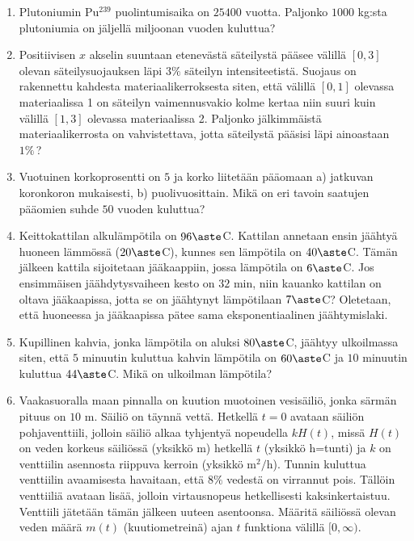 \Harj
\begin{enumerate}

\item
Plutoniumin Pu$^{239}$ puolintumisaika on $25400$ vuotta. Paljonko $1000$ kg:sta plutoniumia
on jäljellä miljoonan vuoden kuluttua?

\item
Positiivisen $x$ akselin suuntaan etenevästä säteilystä pääsee välillä $[0,3]$ olevan
säteilysuojauksen läpi $3\%$ säteilyn intensiteetistä. Suojaus on rakennettu kahdesta
materiaalikerroksesta siten, että välillä $[0,1]$ olevassa materiaalissa 1 on säteilyn 
vaimennusvakio kolme kertaa niin suuri kuin välillä $[1,3]$ olevassa materiaalissa 2. Paljonko
jälkimmäistä materiaalikerrosta on vahvistettava, jotta säteilystä pääsisi läpi ainoastaan
$1\%$\,?
 
\item
Vuotuinen korkoprosentti on $5$ ja korko liitetään pääomaan a) jatkuvan koronkoron mukaisesti,
b) puolivuosittain. Mikä on eri tavoin saatujen pääomien suhde $50$ vuoden kuluttua?

\item
Keittokattilan alkulämpötila on $96\aste$C. Kattilan annetaan ensin jäähtyä huoneen lämmössä
($20\aste$C), kunnes sen lämpötila on $40\aste$C. Tämän jälkeen kattila sijoitetaan 
jääkaappiin, jossa lämpötila on $6\aste$C. Jos ensimmäisen jäähdytysvaiheen kesto on $32$ min,
niin kauanko kattilan on oltava jääkaapissa, jotta se on jäähtynyt lämpötilaan $7\aste$C? 
Oletetaan, että huoneessa ja jääkaapissa pätee sama eksponentiaalinen jäähtymislaki.

\item
Kupillinen kahvia, jonka lämpötila on aluksi $80\aste$C, jäähtyy ulkoilmassa siten, että $5$ 
minuutin kuluttua kahvin lämpötila on $60\aste$C ja $10$ minuutin kuluttua $44\aste$C. Mikä on
ulkoilman lämpötila?
 
\item
Vaakasuoralla maan pinnalla on kuution muotoinen vesisäiliö, jonka särmän pituus on $10$ m.
Säiliö on täynnä vettä. Hetkellä $t=0$ avataan säiliön pohjaventtiili, jolloin säiliö alkaa
tyhjentyä nopeudella $kH(t)$, missä $H(t)$ on veden korkeus säiliössä (yksikkö m) hetkellä
$t$ (yksikkö h=tunti) ja $k$ on venttiilin asennosta riippuva kerroin (yksikkö 
$\text{m}^2/\text{h}$). Tunnin kuluttua venttiilin avaamisesta havaitaan, että $8\%$
vedestä on virrannut pois. Tällöin venttiiliä avataan lisää, jolloin virtausnopeus
hetkellisesti kaksinkertaistuu. Venttiili jätetään tämän jälkeen uuteen asentoonsa. Määritä
säiliössä olevan veden määrä $m(t)$ (kuutiometreinä) ajan $t$ funktiona välillä $[0,\infty)$.


\end{enumerate}
